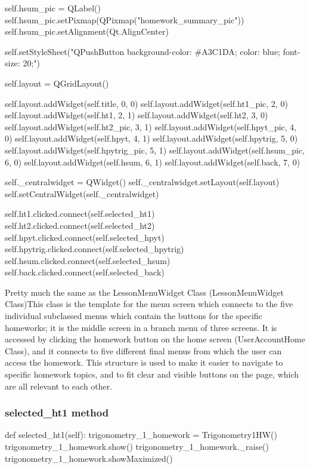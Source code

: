 \begin{python}
        self.hsum_pic = QLabel()
        self.hsum_pic.setPixmap(QPixmap("homework_summary_pic"))
        self.hsum_pic.setAlignment(Qt.AlignCenter)

        self.setStyleSheet("QPushButton {background-color: #A3C1DA; color: blue; font-size: 20;}")

        self.layout = QGridLayout()

        self.layout.addWidget(self.title, 0, 0) 
        self.layout.addWidget(self.ht1_pic, 2, 0)
        self.layout.addWidget(self.ht1, 2, 1)
        self.layout.addWidget(self.ht2, 3, 0)
        self.layout.addWidget(self.ht2_pic, 3, 1)
        self.layout.addWidget(self.hpyt_pic, 4, 0)
        self.layout.addWidget(self.hpyt, 4, 1)
        self.layout.addWidget(self.hpytrig, 5, 0)
        self.layout.addWidget(self.hpytrig_pic, 5, 1)
        self.layout.addWidget(self.hsum_pic, 6, 0)
        self.layout.addWidget(self.hsum, 6, 1)
        self.layout.addWidget(self.back, 7, 0)

        self._centralwidget = QWidget()
        self._centralwidget.setLayout(self.layout)
        self.setCentralWidget(self._centralwidget)

        self.ht1.clicked.connect(self.selected_ht1)
        self.ht2.clicked.connect(self.selected_ht2)
        self.hpyt.clicked.connect(self.selected_hpyt)
        self.hpytrig.clicked.connect(self.selected_hpytrig)
        self.hsum.clicked.connect(self.selected_hsum)
        self.back.clicked.connect(self.selected_back)
\end{python}

Pretty much the same as the LessonMenuWidget Class (LessonMenuWidget Class)This class is the template for the menu screen which connects to the five individual subclassed menus which contain the buttons for the specific homeworks; it is the middle screen in a branch menu of three screens. It is accessed by clicking the homework button on the home screen (UserAccountHome Class), and it connects to five different final menus from which the user can access the homework. This structure is used to make it easier to navigate to specific homework topics, and to fit clear and visible buttons on the page, which are all relevant to each other. 

\subsubsection{selected\_ht1 method}

\begin{python}
def selected_ht1(self):
        trigonometry_1_homework = Trigonometry1HW()
        trigonometry_1_homework.show()
        trigonometry_1_homework._raise()
        trigonometry_1_homework.showMaximized()
\end{python}

